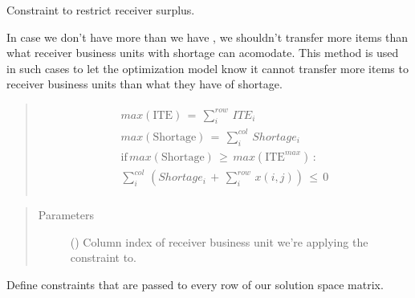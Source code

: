 \documentclass[letterpaper,10pt,english]{sphinxmanual}
\begin{document}
\begin{fulllineitems}
\begin{fulllineitems}
\label{\detokenize{source/optimization.model:optimization.model.optimizer.OptimizationModel._restrict_receiver_surplus}}
Constraint to restrict receiver surplus.

In case we don’t have more  than we have ,         we shouldn’t transfer more items than what receiver business units with         shortage can acomodate. This method is used in such cases to let the optimization model         know it cannot transfer more items to receiver business units than what they have of shortage.
\begin{quote}
\begin{align*}\!\begin{aligned}
max(\text{ITE}) \, = \,\sum_{i}^{row} \, ITE_{i}\\
max(\text{Shortage}) \, = \,\sum_{i}^{col} \,  Shortage_{i}\\
\text{if} \, max(\text{Shortage}) \, \geq \, max(\text{ITE}^{max}) \, \text{:}\\
\sum_{i}^{col} \, ( Shortage_{i} \, + \, \sum_{i}^{row} \, x(i, j) ) \, \leq \, 0\\
\end{aligned}\end{align*}\end{quote}
\begin{quote}\begin{description}
\item[{Parameters}] \leavevmode
{} () \textendash{} Column index of receiver business unit we’re applying the constraint to.

\end{description}\end{quote}

\end{fulllineitems}


\begin{fulllineitems}
\label{\detokenize{source/optimization.model:optimization.model.optimizer.OptimizationModel._row_constraints}}
Define constraints that are passed to every row of our solution space matrix.


\end{fulllineitems}
\end{fulllineitems}
\end{document}
